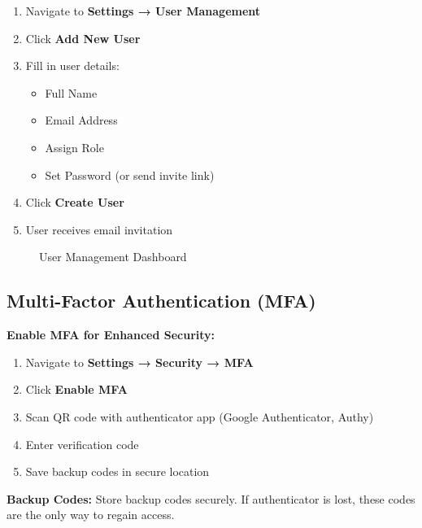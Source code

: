 \begin{enumerate}
    \item Navigate to \textbf{Settings → User Management}
    \item Click \textbf{Add New User}
    \item Fill in user details:
    \begin{itemize}
        \item Full Name
        \item Email Address
        \item Assign Role
        \item Set Password (or send invite link)
    \end{itemize}
    \item Click \textbf{Create User}
    \item User receives email invitation
\end{enumerate}

\begin{figure}[h]
\centering
{}
\caption{User Management Dashboard}
\label{fig:user-mgmt}
\end{figure}

\subsection{Multi-Factor Authentication (MFA)}

\textbf{Enable MFA for Enhanced Security:}
\begin{enumerate}
    \item Navigate to \textbf{Settings → Security → MFA}
    \item Click \textbf{Enable MFA}
    \item Scan QR code with authenticator app (Google Authenticator, Authy)
    \item Enter verification code
    \item Save backup codes in secure location
\end{enumerate}

\begin{warningbox}
\textbf{Backup Codes:} Store backup codes securely. If authenticator is lost, these codes are the only way to regain access.
\end{warningbox}



